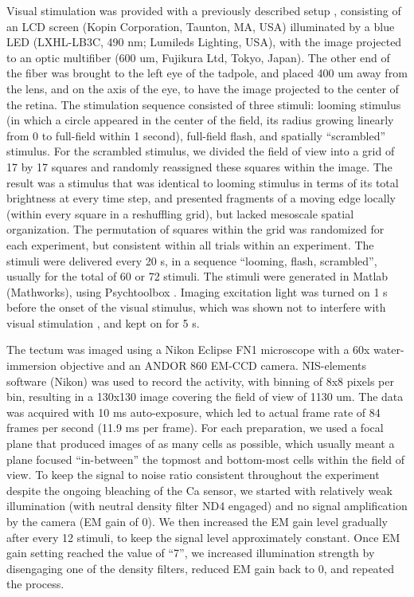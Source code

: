 \documentclass{article}
\begin{document}
Visual stimulation was provided with a previously described setup \citep{khakhalin2014}, consisting of an LCD screen (Kopin Corporation, Taunton, MA, USA) illuminated by a blue LED (LXHL-LB3C, 490 nm; Lumileds Lighting, USA), with the image projected to an optic multifiber (600 um, Fujikura Ltd, Tokyo, Japan). The other end of the fiber was brought to the left eye of the tadpole, and placed 400 um away from the lens, and on the axis of the eye, to have the image projected to the center of the retina. The stimulation sequence consisted of three stimuli: looming stimulus (in which a circle appeared in the center of the field, its radius growing linearly from 0 to full-field within 1 second), full-field flash, and spatially “scrambled” stimulus. For the scrambled stimulus, we divided the field of view into a grid of 17 by 17 squares and randomly reassigned these squares within the image. The result was a stimulus that was identical to looming stimulus in terms of its total brightness at every time step, and presented fragments of a moving edge locally (within every square in a reshuffling grid), but lacked mesoscale spatial organization. The permutation of squares within the grid was randomized for each experiment, but consistent within all trials within an experiment. The stimuli were delivered every 20 s, in a sequence “looming, flash, scrambled”, usually for the total of 60 or 72 stimuli. The stimuli were generated in Matlab (Mathworks), using Psychtoolbox \citep{kleiner2007psychtoolbox}. Imaging excitation light was turned on 1 s before the onset of the visual stimulus, which was shown not to interfere with visual stimulation \citep{xu2011}, and kept on for 5 s.

The tectum was imaged using a Nikon Eclipse FN1 microscope with a 60x water-immersion objective and an ANDOR 860 EM-CCD camera. NIS-elements software (Nikon) was used to record the activity, with binning of 8x8 pixels per bin, resulting in a 130x130 image covering the field of view of 1130 um. The data was acquired with 10 ms auto-exposure, which led to actual frame rate of 84 frames per second (11.9 ms per frame). For each preparation, we used a focal plane that produced images of as many cells as possible, which usually meant a plane focused “in-between” the topmost and bottom-most cells within the field of view. To keep the signal to noise ratio consistent throughout the experiment despite the ongoing bleaching of the Ca sensor, we started with relatively weak illumination (with neutral density filter ND4 engaged) and no signal amplification by the camera (EM gain of 0). We then increased the EM gain level gradually after every 12 stimuli, to keep the signal level approximately constant. Once EM gain setting reached the value of “7”, we increased illumination strength by disengaging one of the density filters, reduced EM gain back to 0, and repeated the process.
\end{document}
